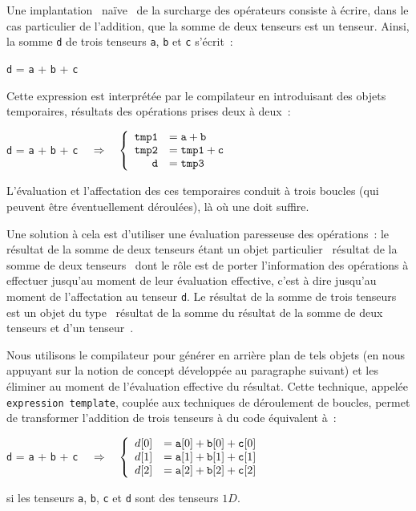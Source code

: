 \documentclass[rectoverso,pleiades,pstricks,leqno,anti]{texmf/note_technique_2010}
\begin{document}
Une implantation \og~naïve~\fg{} de la surcharge des opérateurs
consiste à écrire, dans le cas particulier de l'addition, que la somme
de deux tenseurs est un tenseur. Ainsi, la somme \texttt{d} de trois
tenseurs \texttt{a}, \texttt{b} et \texttt{c} s'écrit~:
\begin{center}
  \texttt{d} =  \texttt{a} + \texttt{b} + \texttt{c}
\end{center}
Cette expression est interprétée par le compilateur en introduisant
des objets temporaires, résultats des opérations prises deux à deux~:
\begin{center}
  \texttt{d} =  \texttt{a} + \texttt{b} + \texttt{c}
  \(\quad\Rightarrow\quad
  \left\{
      \begin{array}[p]{rl}
        \text{\texttt{tmp1}} &= \text{\texttt{a}}    + \text{\texttt{b}} \\ 
        \text{\texttt{tmp2}} &= \text{\texttt{tmp1}} + \text{\texttt{c}} \\ 
        \text{\texttt{d}}    &= \text{\texttt{tmp3}}
      \end{array}
    \right.
    \)
\end{center}

L'évaluation et l'affectation des ces temporaires conduit à trois
boucles (qui peuvent être éventuellement déroulées), là où une doit
suffire.

Une solution à cela est d'utiliser une évaluation paresseuse des
opérations~: le résultat de la somme de deux tenseurs étant un objet
particulier \og~résultat de la somme de deux tenseurs~\fg{} dont le
rôle est de porter l'information des opérations à effectuer jusqu'au
moment de leur évaluation effective, c'est à dire jusqu'au moment de
l'affectation au tenseur \texttt{d}. Le résultat de la somme de trois
tenseurs est un objet du type \og~résultat de la somme du résultat de
la somme de deux tenseurs et d'un tenseur~\fg{}. 

Nous utilisons le compilateur pour générer en arrière plan de tels
objets (en nous appuyant sur la notion de concept développée au
paragraphe suivant) et les éliminer au moment de l'évaluation
effective du résultat. Cette technique, appelée \texttt{expression
  template}, couplée aux techniques de déroulement de boucles, permet
de transformer l'addition de trois tenseurs à du code équivalent à~:
\begin{center}
  \texttt{d} =  \texttt{a} + \texttt{b} + \texttt{c}
  \(\quad\Rightarrow\quad
  \left\{
      \begin{array}[p]{rl}
        d[0] &= \texttt{a}[0] + \texttt{b}[0] + \texttt{c}[0] \\
        d[1] &= \texttt{a}[1] + \texttt{b}[1] + \texttt{c}[1] \\
        d[2] &= \texttt{a}[2] + \texttt{b}[2] + \texttt{c}[2] \\
      \end{array}
    \right.
    \)
\end{center}
si les tenseurs \texttt{a}, \texttt{b}, \texttt{c} et \texttt{d} sont
des tenseurs \(1D\).
\end{document}
